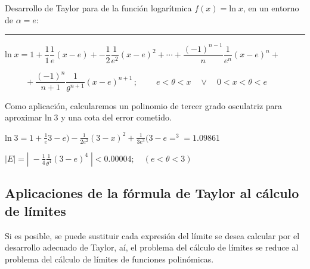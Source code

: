 \vspace{5mm}	
\begin{miejercicio}
	
Desarrollo de Taylor para de la función logarítmica  $f(x)=\mathrm{ln}\;x$, en un entorno de $\alpha=e$:

\rule{200pt}{0.1pt}
	
	\vspace{3mm} $\mathrm{ln}\; x = 1 + \dfrac 1 1 \dfrac 1 e (x-e) +- \dfrac 1 2 \dfrac 1 {e^2} (x-e)^2 + \cdots + \dfrac {(-1)^{n-1}}{n} \dfrac 1 {e^n} (x-e)^n + $
	
	$ \qquad \ \ + \dfrac {(-1)^n}{n+1} \dfrac 1 {\theta ^{n+1}} (x-e)^{n+1} \, ; \ \qquad e < \theta < x \quad \vee \quad 0 < x < \theta < e$
	
	\vspace{3mm} Como aplicación, calcularemos un polinomio de tercer grado osculatriz para aproximar $\mathrm{ln}\; 3$ y una cota del error cometido.
	
	\vspace{2mm} $\mathrm{ln}\; 3 = 1+ \frac 1 e 3-e)- \frac 1 {2e^2}(3-x)^2+ \frac 1 {3e^3}(3-e=^3 = 1.09861$
	
	$|E|=|\; - \frac 1 4 \frac 1 {\theta^4} (3-e)^4  \;| < 0.00004; \quad (e<\theta<3) \;$
		
\end{miejercicio}

\vspace{5mm}	
	
	
\subsection{Aplicaciones de la fórmula de Taylor al cálculo de límites}

\vspace{0.5cm}

	Si es posible, se puede sustituir cada expresión del límite se desea calcular por el desarrollo adecuado de Taylor, aí, el problema del cálculo de límites se reduce al problema del cálculo de límites de funciones polinómicas.

